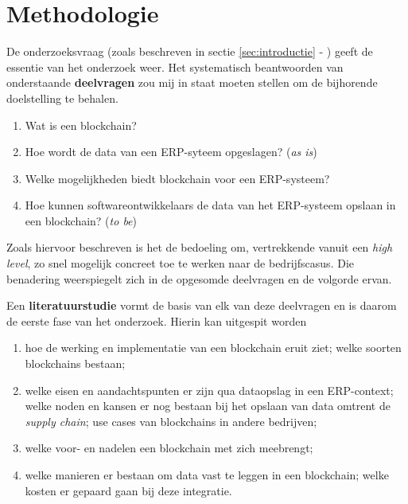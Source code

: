 

\section{Methodologie}
\label{sec:methodologie}

De onderzoeksvraag (zoals beschreven in sectie \ref{sec:introductie} - ) geeft de essentie van het onderzoek weer. Het systematisch beantwoorden van onderstaande \textbf{deelvragen} zou mij in staat moeten stellen om de bijhorende doelstelling te behalen.

\begin{enumerate}
	\item Wat is een blockchain?
	\item Hoe wordt de data van een ERP-syteem opgeslagen? (\textit{as is})
	\item Welke mogelijkheden biedt blockchain voor een ERP-systeem?
	\item Hoe kunnen softwareontwikkelaars de data van het ERP-systeem opslaan in een blockchain? (\textit{to be})
	
\end{enumerate}

Zoals hiervoor beschreven is het de bedoeling om, vertrekkende vanuit een \textit{high level}, zo snel mogelijk concreet toe te werken naar de bedrijfscasus. Die benadering weerspiegelt zich in de opgesomde deelvragen en de volgorde ervan.

Een \textbf{literatuurstudie} vormt de basis van elk van deze deelvragen en is daarom de eerste fase van het onderzoek. Hierin kan uitgespit worden
\begin{enumerate}
	\item hoe de werking en implementatie van een blockchain eruit ziet; welke soorten blockchains bestaan;
	\item welke eisen en aandachtspunten er zijn qua dataopslag in een ERP-context; welke noden en kansen er nog bestaan bij het opslaan van data omtrent de \textit{supply chain}; use cases van blockchains in andere bedrijven;
	\item welke voor- en nadelen een blockchain met zich meebrengt; 
	\item welke manieren er bestaan om data vast te leggen in een blockchain; welke kosten er gepaard gaan bij deze integratie.
\end{enumerate}


